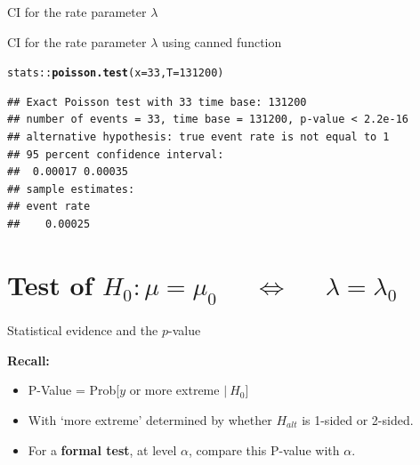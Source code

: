 \documentclass[10pt,handout]{beamer}\usepackage[]{graphicx}\usepackage[]{color}
\makeatletter
\newcommand{\hlnum}[1]{\textcolor[rgb]{0.686,0.059,0.569}{#1}}%
\newcommand{\hlopt}[1]{\textcolor[rgb]{0,0,0}{#1}}%
\newcommand{\hlstd}[1]{\textcolor[rgb]{0.345,0.345,0.345}{#1}}%
\newcommand{\hlkwc}[1]{\textcolor[rgb]{0.333,0.667,0.333}{#1}}%
\newcommand{\hlkwd}[1]{\textcolor[rgb]{0.737,0.353,0.396}{\textbf{#1}}}%
\newenvironment{kframe}{%
 \def\at@end@of@kframe{}%
 \ifinner\ifhmode%
  \def\at@end@of@kframe{\end{minipage}}%
  \begin{minipage}{\columnwidth}%
 \fi\fi%
 \def\FrameCommand##1{\hskip\@totalleftmargin \hskip-\fboxsep
 \colorbox{shadecolor}{##1}\hskip-\fboxsep
     \hskip-\linewidth \hskip-\@totalleftmargin \hskip\columnwidth}%
 \MakeFramed {\advance\hsize-\width
   \@totalleftmargin\z@ \linewidth\hsize
   \@setminipage}}%
 {\par\unskip\endMakeFramed%
 \at@end@of@kframe}
\newenvironment{knitrout}{}{} %
\makeatother
\begin{document}
\begin{frame}[fragile]{CI for the rate  parameter $\lambda$}
\begin{itemize}
		
	\end{itemize}
	
\end{frame}


\begin{frame}[fragile]{CI for the rate  parameter $\lambda$ using canned function}
	
\begin{knitrout}\tiny
{}\color{fgcolor}\begin{kframe}
\begin{alltt}
\hlstd{stats}\hlopt{::}\hlkwd{poisson.test}\hlstd{(}\hlkwc{x} \hlstd{=} \hlnum{33}\hlstd{,} \hlkwc{T} \hlstd{=} \hlnum{131200}\hlstd{)}
\end{alltt}
\begin{verbatim}
## Exact Poisson test with 33 time base: 131200 
## number of events = 33, time base = 131200, p-value < 2.2e-16
## alternative hypothesis: true event rate is not equal to 1 
## 95 percent confidence interval:
##  0.00017 0.00035 
## sample estimates:
## event rate 
##    0.00025
\end{verbatim}
\end{kframe}
\end{knitrout}
	
\end{frame}



\section{Test of $H_{0}: \mu = \mu_{0}$ $\quad \Leftrightarrow \quad$ $\lambda = \lambda_{0}$}


\begin{frame}{Statistical evidence and the $p$-value}
	
	\textbf{Recall:}
	
	\vspace*{1cm}
	
	\begin{itemize}
		\setlength\itemsep{1.2em}
		\item P-Value = Prob[$y$ or more extreme $ |\:H_{0}$]
		
		\item With `more extreme' determined by whether $H_{alt}$ is  1-sided or 2-sided. 
		
		\item For a \textbf{formal test}, at level $\alpha$, compare this P-value with $\alpha$.
	\end{itemize}
	
\end{frame}
\end{document}
